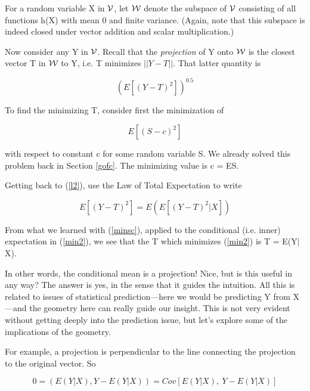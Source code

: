 For a random variable X in $\cal V$, let $\cal W$ denote the subspace of
$\cal V$ consisting of all functions h(X) with mean 0 and finite
variance.  (Again, note that this subspace is indeed closed under vector
addition and scalar multiplication.) 

Now consider any Y in $\cal V$.  Recall that the {\it projection} of Y
onto $\cal W$ is the closest vector T in $\cal W$ to Y, i.e. T minimizes
$||Y-T||$.  That latter quantity is 

\begin{equation}
\label{l2}
{\left ( E[{(Y-T)}^2] \right )}^{0.5}
\end{equation}

To find the minimizing T, consider first the minimization of

\begin{equation}
\label{minsc}
E[{(S-c)}^2]
\end{equation}

with respect to constant c for some random variable S.  We already
solved this problem back in Section \ref{gofc}.  The minimizing value 
is c = ES.

Getting back to (\ref{l2}), use the Law of Total Expectation to write

\begin{equation}
\label{min2}
E[{(Y-T)}^2] = E \left (  E[{(Y-T)}^2|X]\right )
\end{equation}

From what we learned with (\ref{minsc}), applied to the conditional
(i.e. inner) expectation in (\ref{min2}), we see that the T which
minimizes (\ref{min2}) is T = E(Y$|$X).  

In other words, the conditional mean is a projection!  Nice, but is this
useful in any way?  The answer is yes, in the sense that it guides the
intuition.  All this is related to issues of statistical
prediction---here we would be predicting Y from X---and the geometry
here can really guide our insight.  This is not very evident without
getting deeply into the prediction issue, but let's explore some of the
implications of the geometry.

For example, a projection is perpendicular to the line connecting the
projection to the original vector.  So

\begin{equation}
\label{err}
0 = (E(Y|X),Y-E(Y|X)) 
= Cov[E(Y|X), ~ Y-E(Y|X)]
\end{equation}

